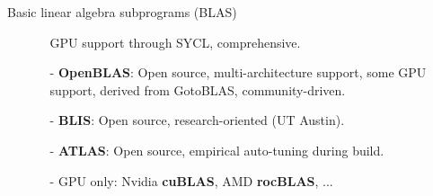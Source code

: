 \documentclass[t,usepdftitle=false]{beamer}
\begin{document}
\begin{frame}{Basic linear algebra subprograms (BLAS)}
\begin{itemize}
\begin{itemize}
\hspace{3.23cm}GPU support through SYCL, comprehensive.\vspace{.03cm}
\item[-] \textbf{OpenBLAS}: Open source, multi-architecture support, some GPU\\
\hspace{2.25cm}support, derived from GotoBLAS, community-driven.\vspace{.03cm}
\item[-] \textbf{BLIS}: Open source, research-oriented (UT Austin).\vspace{.03cm}
\item[-] \textbf{ATLAS}: Open source, empirical auto-tuning during build.\vspace{.03cm}
\item[-] GPU only: Nvidia \textbf{cuBLAS}, AMD \textbf{rocBLAS}, ...
\end{itemize}
\end{itemize}
\end{frame}
\end{document}
